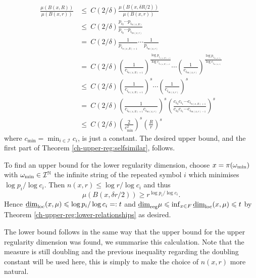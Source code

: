 \begin{align*}
\frac{\mu(B(x,R))}{\mu (B(x,r))}& \le \ C(2/\delta) \frac{\mu(B(x,\delta R/2))}{\mu (B(x,r))}  \\
& \le \ C(2/\delta) \frac{p_{i_0}\cdots p_{i_{n(x,R)}}}{p_{i_0}\cdots p_{i_{m(x,r)}}} \\
& =\  C(2/\delta)  \frac{1}{p_{i_{n(x,R)+1}}} \cdots \frac{1}{p_{i_{m(x,r)}}} \\
& = \ C(2/\delta)  \left(\frac{1}{c_{i_{n(x,R)+1}}}\right)^{\frac{\log p_{i_{n(x,R)+1}}}{\log c_{i_{n(x,R)+1}}} } \cdots \left(\frac{1}{c_{i_{m(x,r)}}}\right)^{\frac{\log p_{i_{m(x,r)}}}{\log c_{i_{m(x,r)} }}} \\
& \le\  C(2/\delta)  \left( \frac{1}{c_{i_{n(x,R)+1}}}\right)^s \cdots \left( \frac{1}{c_{i_{m(x,r)}}}\right)^s \\
& = \ C(2/\delta)  \left(\frac{1}{c_{i_{n(x,R)+1}} c_{i_{m(x,r)}}}\right)^s \left( \frac{c_{i_0}c_{i_1} \cdots c_{i_{n(x,R)+1}}}{c_{i_0}c_{i_1} \cdots c_{i_{m(x,r)-1}}}\right)^s \\
& \le \  C(2/\delta)   \left(\frac{2}{c_{\min}^2}\right)^s \left( \frac{R}{r}\right)^s
\end{align*}
where $c_{\min} = \min_{i\in \mathcal{I}}c_i$, is just a constant. The desired upper bound, and the first part of Theorem \ref{ch-upper-reg:selfsimilar}, follows.


To find an upper bound for the lower regularity dimension, choose $x = \pi (\omega_\textup{min})$ with $\omega_\textup{min} \in \mathcal{I}^{\mathbb{N}}$ the infinite string of the repeated symbol $i$ which minimises $\log p_i / \log c_i$. Then $n(x,r) \le  \log r / \log c_i$ and thus
\[
\mu(B(x,\delta r / 2)) \ge r^{\log p_i / \log c_i}.
\]
Hence $\underline{\dim}_{\textup{loc}}(x,\mu) \leqslant \log p_i/\log c_i =: t$ and $\underline{\dim}_{\textup{reg}} \mu \leqslant \inf_{x\in F} \underline{\dim}_{\textup{loc}}(x,\mu) \leqslant t$ by Theorem \ref{ch-upper-reg:lower-relationships} as desired.

The lower bound follows in the same way that the upper bound for the upper regularity dimension was found, we summarise this calculation. Note that the measure is still doubling and the previous inequality regarding the doubling constant will be used here, this is simply to make the choice of $n(x,r)$ more natural.

